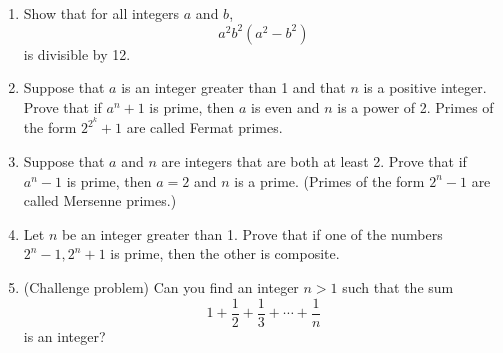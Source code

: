 \documentclass[12pt, reqno]{amsart}
\begin{document}
\begin{enumerate}
\item Show that for all integers $a$ and $b$, 
\[
a^2b^2(a^2 - b^2)
\]
is divisible by 12.


\item Suppose that $a$ is an integer greater than 1 and that $n$ is a positive integer. Prove that if $a^n +1$ is prime, then $a$ is even and $n$ is a power of 2. Primes of the form $2^{2^k} + 1$ are called Fermat primes.

\item Suppose that $a$ and $n$ are integers that are both at least 2.  Prove that if $a^n -1$ is prime, then $a = 2$ and $n$ is a prime. (Primes of the form $2^n - 1$ are called Mersenne primes.)

\item Let $n$ be an integer greater than 1. Prove that if one of the numbers $2^n - 1, 2^n + 1$ is prime, then the other is composite.


\vspace{15pt}

\item (Challenge problem) Can you find an integer $n > 1$ such that the sum
$$1 + \frac{1}{2}+ \frac{1}{3}+ \cdots + \frac{1}{n}$$
 is an integer? 

\end{enumerate}
\end{document}
